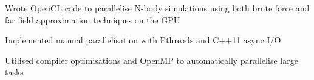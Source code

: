 \documentclass[letterpaper]{deedy-resume} %
\begin{document}
\begin{minipage}[t]{0.66\textwidth}
\begin{tightitemize}
\item Wrote OpenCL code to parallelise N-body simulations using both brute force and far field approximation techniques on the GPU
\item Implemented manual parallelisation with Pthreads and C++11 async I/O
\item Utilised compiler optimisations and OpenMP to automatically parallelise large tasks
\end{tightitemize}


\end{minipage} %








\end{document}
